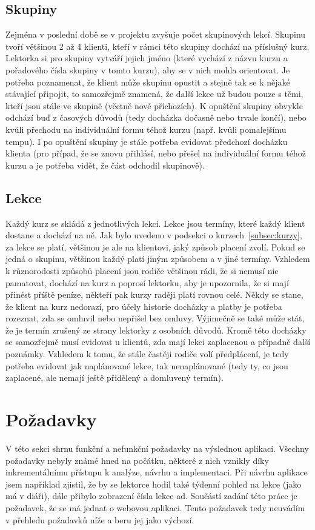         \subsection{Skupiny}\label{subsec:skupiny}
        Zejména v poslední době se v projektu zvyšuje počet skupinových lekcí. Skupinu tvoří většinou 2 až 4 klienti, kteří v rámci této skupiny dochází na příslušný kurz. Lektorka si pro skupiny vytváří jejich jméno (které vychází z názvu kurzu a pořadového čísla skupiny v tomto kurzu), aby se v nich mohla orientovat. Je potřeba poznamenat, že klient může skupinu opustit a stejně tak se k nějaké stávající připojit, to samozřejmě znamená, že další lekce už budou pouze s těmi, kteří jsou stále ve skupině (včetně nově příchozích). K opuštění skupiny obvykle odchází buď z časových důvodů (tedy docházka dočasně nebo trvale končí), nebo kvůli přechodu na individuální formu téhož kurzu (např. kvůli pomalejšímu tempu). I po opuštění skupiny je stále potřeba evidovat předchozí docházku klienta (pro případ, že se znovu přihlásí, nebo přešel na individuální formu téhož kurzu a je potřeba vidět, že část odchodil skupinově). 
        
        \subsection{Lekce}
        Každý kurz se skládá z jednotlivých lekcí. Lekce jsou termíny, které každý klient dostane a dochází na ně. Jak bylo uvedeno v podsekci o kurzech~\ref{subsec:kurzy}, za lekce se platí, většinou je ale na klientovi, jaký způsob placení zvolí. Pokud se jedná o skupinu, většinou každý platí jiným způsobem a v jiné termíny. Vzhledem k různorodosti způsobů placení jsou rodiče většinou rádi, že si nemusí nic pamatovat, dochází na kurz a poprosí lektorku, aby je upozornila, že si mají přinést příště peníze, někteří pak kurzy raději platí rovnou celé. Někdy se stane, že klient na kurz nedorazí, pro účely historie docházky a platby je potřeba rozeznat, zda se omluvil nebo nepřišel bez omluvy. Výjimečně se také může stát, že je termín zrušený ze strany lektorky z osobních důvodů. Kromě této docházky se samozřejmě musí evidovat u klientů, zda mají lekci zaplacenou a případně další poznámky. Vzhledem k tomu, že stále častěji rodiče volí předplácení, je tedy potřeba evidovat jak naplánované lekce, tak nenaplánované (tedy ty, co jsou zaplacené, ale nemají ještě přidělený a domluvený termín).
    
    \section{Požadavky}
    V této sekci shrnu funkční a nefunkční požadavky na výslednou aplikaci. Všechny požadavky nebyly známé hned na počátku, některé z nich vznikly díky inkrementálnímu přístupu k analýze, návrhu a implementaci. Při návrhu aplikace jsem například zjistil, že by se lektorce hodil také týdenní pohled na lekce (jako má v diáři), dále přibylo zobrazení čísla lekce ad. Součástí zadání této práce je požadavek, že se má jednat o webovou aplikaci. Tento požadavek tedy neuvádím v přehledu požadavků níže a beru jej jako výchozí.
    
